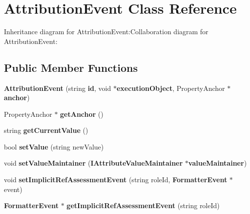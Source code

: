 \section{AttributionEvent Class Reference}
\label{classbr_1_1pucrio_1_1telemidia_1_1ginga_1_1ncl_1_1model_1_1event_1_1AttributionEvent}
Inheritance diagram for AttributionEvent:Collaboration diagram for AttributionEvent:\subsection*{Public Member Functions}
\begin{CompactItemize}
\item 
\textbf{AttributionEvent} (string {\bf id}, void $\ast${\bf executionObject}, PropertyAnchor $\ast${\bf anchor})\label{classbr_1_1pucrio_1_1telemidia_1_1ginga_1_1ncl_1_1model_1_1event_1_1AttributionEvent_0d0a3217566a660d4e8cc58076b40c9b}

\item 
PropertyAnchor $\ast$ \textbf{getAnchor} ()\label{classbr_1_1pucrio_1_1telemidia_1_1ginga_1_1ncl_1_1model_1_1event_1_1AttributionEvent_38edf8bf78c885f145aa096d89ce3c24}

\item 
string \textbf{getCurrentValue} ()\label{classbr_1_1pucrio_1_1telemidia_1_1ginga_1_1ncl_1_1model_1_1event_1_1AttributionEvent_1d8502d2c19bdec2498115061e47e9ff}

\item 
bool \textbf{setValue} (string newValue)\label{classbr_1_1pucrio_1_1telemidia_1_1ginga_1_1ncl_1_1model_1_1event_1_1AttributionEvent_830d852cfeab751270db4e2eef45df97}

\item 
void \textbf{setValueMaintainer} ({\bf IAttributeValueMaintainer} $\ast${\bf valueMaintainer})\label{classbr_1_1pucrio_1_1telemidia_1_1ginga_1_1ncl_1_1model_1_1event_1_1AttributionEvent_c1072af2c5c39cc0902e483300698a17}

\item 
void \textbf{setImplicitRefAssessmentEvent} (string roleId, {\bf FormatterEvent} $\ast$event)\label{classbr_1_1pucrio_1_1telemidia_1_1ginga_1_1ncl_1_1model_1_1event_1_1AttributionEvent_bf5ae37dbf84cbbb58550d07060fd7f8}

\item 
{\bf FormatterEvent} $\ast$ \textbf{getImplicitRefAssessmentEvent} (string roleId)\label{classbr_1_1pucrio_1_1telemidia_1_1ginga_1_1ncl_1_1model_1_1event_1_1AttributionEvent_2c8cd083f35dc715a2a2f1b76187f7b6}

\end{CompactItemize}
